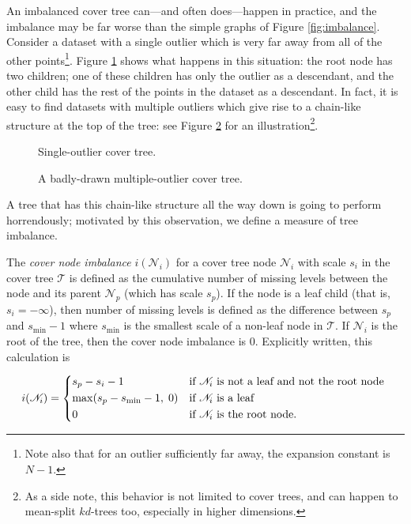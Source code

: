 An imbalanced cover tree can---and often does---happen in practice, and the
imbalance may be far worse than the simple graphs of Figure \ref{fig:imbalance}.
Consider a dataset with a single outlier which is very far away from all of the
other points\footnote{Note also that for an outlier sufficiently far away, the
expansion constant is $N - 1$.}.  Figure \ref{fig:outlier} shows what happens in
this situation: the root node has two children; one of these children has only
the outlier as a descendant, and the other child has the rest of the points in
the dataset as a descendant.  In fact, it is easy to find datasets with multiple
outliers which give rise to a chain-like structure at the top of the tree: see
Figure \ref{fig:outliers} for an illustration\footnote{As a side note, this
behavior is not limited to cover trees, and can happen to mean-split $kd$-trees
too, especially in higher dimensions.}.

\begin{figure}
\begin{center}
  
\end{center}
\label{fig:outlier}
\caption{Single-outlier cover tree.}
\end{figure}

\begin{figure}
\begin{center}
  
\end{center}
\caption{A badly-drawn multiple-outlier cover tree.}
\label{fig:outliers}
\end{figure}

A tree that has this chain-like structure all the way down is going to perform
horrendously; motivated by this observation, we define a measure of tree
imbalance.

\begin{defn}
The {\it cover node imbalance} $i(\mathscr{N}_i)$ for a cover tree node
$\mathscr{N}_i$ with scale $s_i$ in the cover tree $\mathscr{T}$ is defined as
the cumulative number of missing levels between the node and its parent
$\mathscr{N}_p$ (which has scale $s_p$).  If
the node is a leaf child (that is, $s_i = -\infty$), then number of missing
levels is defined as the difference between $s_p$ and $s_{\min} - 1$ where
$s_{\min}$ is the smallest scale of a non-leaf node in $\mathscr{T}$.  If
$\mathscr{N}_i$ is the root of the tree, then the cover node imbalance is 0.
Explicitly written, this calculation is

\begin{equation}
i(\mathscr{N}_i) = \begin{dcases*}
  s_p - s_i - 1 & if $\mathscr{N}_i$ is not a leaf and not the root node \\
  \max(s_p - s_{\min} - 1, \; 0) & if $\mathscr{N}_i$ is a leaf \\
  0 & if $\mathscr{N}_i$ is the root node.
  \end{dcases*}
\end{equation}
\end{defn}

